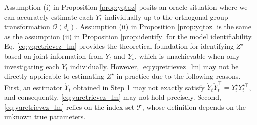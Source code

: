 \documentclass[12pt]{article}
\begin{document}
Assumption (i) in Proposition \ref{prop:yqtoz} posits an oracle situation where we can accurately estimate each $Y_t^{\star}$ individually up to the orthogonal group  transformation $\mathcal{O}(d_t)$.
Assumption (ii) in Proposition \ref{prop:yqtoz} is the same as the assumption (ii) in Proposition \ref{prop:identify} for the model identifiability.  
Eq. \eqref{eq:yqretrievez_lm} provides the theoretical foundation for identifying  $Z^{\star}$ based on joint information from $Y_t$ and $Y_s$,  which is unachievable when only investigating each $Y_t$ individually. 
However,  \eqref{eq:yqretrievez_lm} may not be directly applicable to estimating $Z^{\star}$ in practice due to the following reasons.  
First, an  estimator $\mathring{Y}_t$ obtained in Step 1 may not exactly satisfy $\mathring{Y}_t\mathring{Y}_t^{\top} =  Y_t^{\star}Y_t^{\star\top}$, and consequently,  \eqref{eq:yqretrievez_lm} may not hold precisely. 
Second, \eqref{eq:yqretrievez_lm} relies on the index set  $\mathcal{T}$, whose definition depends on the unknown  true parameters. 
\end{document}
